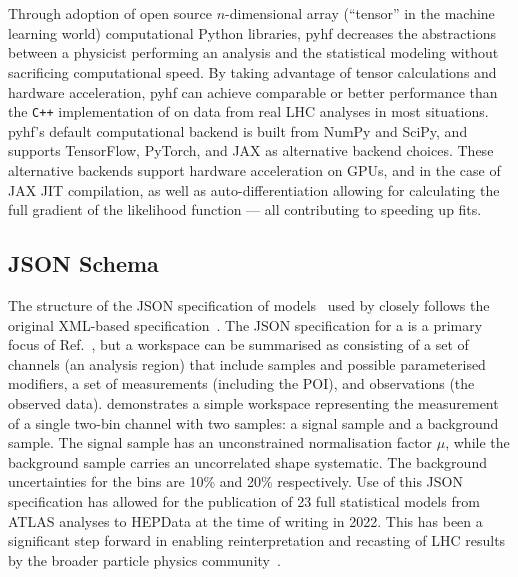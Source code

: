\section{\pyhf{}}\label{sec:pyhf}

Through adoption of open source $n$-dimensional array (``tensor'' in the machine learning world) computational Python libraries, pyhf{} decreases the abstractions between a physicist performing an analysis and the statistical modeling without sacrificing computational speed.
By taking advantage of tensor calculations and hardware acceleration, pyhf{} can achieve comparable or better performance than the \texttt{C++} implementation of \HiFa{} on data from real LHC analyses in most situations.
pyhf{}'s default computational backend is built from NumPy and SciPy, and supports TensorFlow, PyTorch, and JAX as alternative backend choices.
These alternative backends support hardware acceleration on GPUs, and in the case of JAX JIT compilation, as well as auto-differentiation allowing for calculating the full gradient of the likelihood function --- all contributing to speeding up fits.

\subsection{JSON Schema}\label{subsec:HistFactory_schema}

The structure of the JSON specification of \HiFa{} models~\cite{ATL-PHYS-PUB-2019-029} used by \pyhf{} closely follows the original XML-based specification~\cite{Cranmer:1456844}.
The JSON specification for a \HiFa{}  is a primary focus of Ref.~\cite{ATL-PHYS-PUB-2019-029}, but a workspace can be summarised as consisting of a set of channels (an analysis region) that include samples and possible parameterised modifiers, a set of measurements (including the POI), and observations (the observed data).
 demonstrates a simple workspace representing the measurement of a single two-bin channel with two samples: a signal sample and a background sample.
The signal sample has an unconstrained normalisation factor $\mu$, while the background sample carries an uncorrelated shape systematic.
The background uncertainties for the bins are 10\% and 20\% respectively.
Use of this JSON specification has allowed for the publication of 23 full statistical models from ATLAS analyses to HEPData at the time of writing in 2022.
This has been a significant step forward in enabling reinterpretation and recasting of LHC results by the broader particle physics community~\cite{Cranmer:2021urp}.

